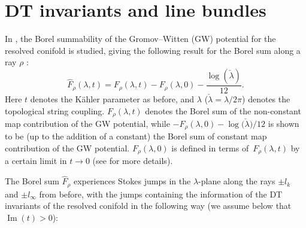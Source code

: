\documentclass[pdftex]{sigma}
\numberwithin{equation}{section}
\begin{document}
\section{DT invariants and line bundles}\label{sec:DT}

In \cite{ASTT21}, the Borel summability of the Gromov--Witten (GW) potential for the resolved conifold is studied, giving the following result for the Borel sum along a ray $\rho$ \cite[equation~(4.35)]{ASTT21}:
\begin{equation}\label{normalizedpartfunc}
 \widehat{F}_{\rho}(\lambda,t)=F_{\rho}(\lambda,t)-F_{\rho}(\lambda,0)-\frac{\log(\check{\lambda})}{12}.
\end{equation}
Here $t$ denotes the K\"{a}hler parameter as before, and $\lambda$ ($\check{\lambda}=\lambda/2\pi$) denotes the topological string coupling. $F_{\rho}(\lambda,t)$ denotes the Borel sum of the non-constant map contribution of the GW potential, while $-F_{\rho}(\lambda,0)-\log\big(\check{\lambda}\big)/12$ is shown to be (up to the addition of a constant) the Borel sum of constant map contribution of the GW potential. $F_{\rho}(\lambda,0)$ is defined in terms of~$F_{\rho}(\lambda,t)$ by a certain limit in $t\to 0$ (see \cite[Section~4.2.1]{ASTT21} for more details).

The Borel sum $\hat{F}_{\rho}$ experiences Stokes jumps in the $\lambda$-plane along the rays $\pm l_{k}$ and $\pm l_{\infty}$ from before, with the jumps containing the information of the DT invariants of the resolved conifold in the following way (we assume below that $\operatorname{Im}(t)>0$):
\end{document}
